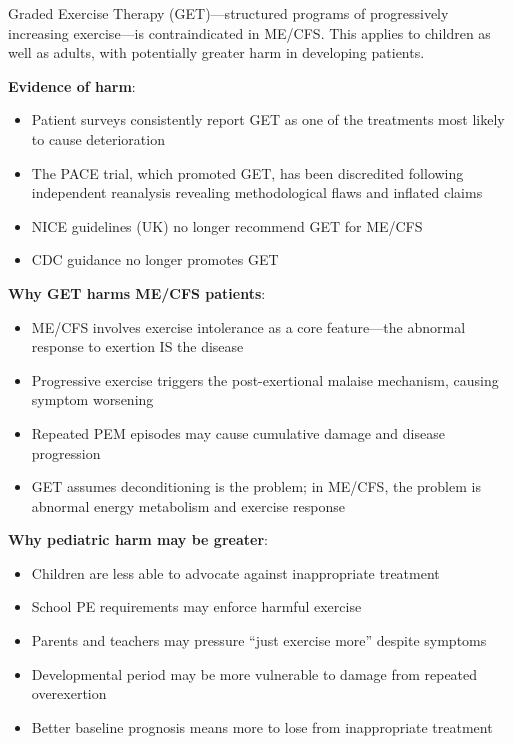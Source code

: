 \begin{practicalwarning}
Graded Exercise Therapy (GET)---structured programs of progressively increasing exercise---is contraindicated in ME/CFS. This applies to children as well as adults, with potentially greater harm in developing patients.

\textbf{Evidence of harm}:
\begin{itemize}
    \item Patient surveys consistently report GET as one of the treatments most likely to cause deterioration
    \item The PACE trial, which promoted GET, has been discredited following independent reanalysis revealing methodological flaws and inflated claims~\cite{Rowe2017pediatric}
    \item NICE guidelines (UK) no longer recommend GET for ME/CFS
    \item CDC guidance no longer promotes GET
\end{itemize}

\textbf{Why GET harms ME/CFS patients}:
\begin{itemize}
    \item ME/CFS involves exercise intolerance as a core feature---the abnormal response to exertion IS the disease
    \item Progressive exercise triggers the post-exertional malaise mechanism, causing symptom worsening
    \item Repeated PEM episodes may cause cumulative damage and disease progression
    \item GET assumes deconditioning is the problem; in ME/CFS, the problem is abnormal energy metabolism and exercise response
\end{itemize}

\textbf{Why pediatric harm may be greater}:
\begin{itemize}
    \item Children are less able to advocate against inappropriate treatment
    \item School PE requirements may enforce harmful exercise
    \item Parents and teachers may pressure ``just exercise more'' despite symptoms
    \item Developmental period may be more vulnerable to damage from repeated overexertion
    \item Better baseline prognosis means more to lose from inappropriate treatment
\end{itemize}


\end{practicalwarning}

